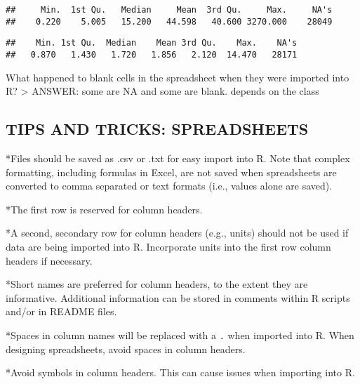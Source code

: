 \documentclass[]{article}
\newenvironment{Shaded}{\begin{snugshade}}{\end{snugshade}}
\newcommand{\KeywordTok}[1]{\textcolor[rgb]{0.13,0.29,0.53}{\textbf{#1}}}
\newcommand{\OperatorTok}[1]{\textcolor[rgb]{0.81,0.36,0.00}{\textbf{#1}}}
\newcommand{\NormalTok}[1]{#1}
\begin{document}
\begin{Shaded}
\end{Shaded}

\begin{verbatim}
##     Min.  1st Qu.   Median     Mean  3rd Qu.     Max.     NA's 
##    0.220    5.005   15.200   44.598   40.600 3270.000    28049
\end{verbatim}

\begin{Shaded}
\end{Shaded}

\begin{verbatim}
##    Min. 1st Qu.  Median    Mean 3rd Qu.    Max.    NA's 
##   0.870   1.430   1.720   1.856   2.120  14.470   28171
\end{verbatim}

What happened to blank cells in the spreadsheet when they were imported
into R? \textgreater{} ANSWER: some are NA and some are blank. depends
on the class

\subsection{TIPS AND TRICKS:
SPREADSHEETS}\label{tips-and-tricks-spreadsheets}

*Files should be saved as .csv or .txt for easy import into R. Note that
complex formatting, including formulas in Excel, are not saved when
spreadsheets are converted to comma separated or text formats (i.e.,
values alone are saved).

*The first row is reserved for column headers.

*A second, secondary row for column headers (e.g., units) should not be
used if data are being imported into R. Incorporate units into the first
row column headers if necessary.

*Short names are preferred for column headers, to the extent they are
informative. Additional information can be stored in comments within R
scripts and/or in README files.

*Spaces in column names will be replaced with a \texttt{.} when imported
into R. When designing spreadsheets, avoid spaces in column headers.

*Avoid symbols in column headers. This can cause issues when importing
into R.
\end{document}
